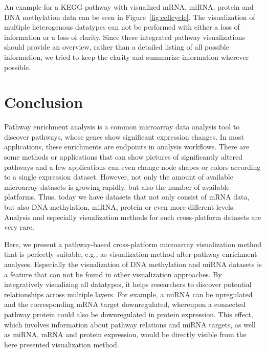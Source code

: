 \documentclass{bioinfo}
\begin{document}
An example for a KEGG pathway with visualized mRNA, miRNA, protein and DNA methylation data can be
seen in Figure~\ref{fig:cellcycle}. The visualization of multiple heterogenous datatypes can not be
performed with either a loss of information or a loss of clarity. Since these integrated pathway
visualizations should provide an overview, rather than a detailed listing of all possible
information, we tried to keep the clarity and summarize information wherever possible.






\section{Conclusion}

Pathway enrichment analysis is a common microarray data analysis tool to discover pathways, whose
genes show significant expression changes. In most applications, these enrichments are endpoints in
analysis workflows. There are some methods or applications that can show pictures of significantly
altered pathways and a few applications can even change node shapes or colors according to a single
expression dataset. However, not only the amount of available microarray datasets is growing
rapidly, but also the number of available platforms. Thus, today we have datasets that not only
consist of mRNA data, but also DNA methylation, miRNA, protein or even more different
levels. Analysis and especially visualization methods for such cross-platform datasets are very
rare.

Here, we present a pathway-based cross-platform microarray visualization method that is perfectly
suitable, e.g., as visualization method after pathway enrichment analyses. Especially the
visualization of DNA methylation and miRNA datasets is a feature that can not be found in other
visualization approaches. By integratively visualizing all datatypes, it helps researchers to
discover potential relationships across multiple layers. For example, a miRNA can be upregulated and
the corresponding mRNA target downregulated, whereupon a connected pathway protein could also be
downregulated in protein expression. This effect, which involves information about pathway relations
and miRNA targets, as well as miRNA, mRNA and protein expression, would be directly visible from the
here presented visualization method.
\end{document}
